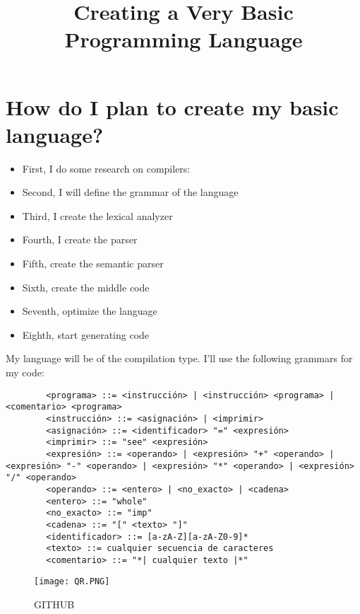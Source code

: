 \documentclass[a4,10pt]{article}
\title{Creating a Very Basic Programming Language}
\begin{document}
	
	\section{How do I plan to create my basic language?}
	\begin{itemize}
		\item First, I do some research on compilers: 
		\item Second, I will define the grammar of the language
		\item Third, I create the lexical analyzer
		\item Fourth, I create the parser
		\item Fifth, create the semantic parser
		\item Sixth, create the middle code
		\item Seventh, optimize the language
		\item Eighth, start generating code
	\end{itemize}
	My language will be of the compilation type.
	I'll use the following grammars for my code:
	
	\begin{verbatim}
		<programa> ::= <instrucción> | <instrucción> <programa> | <comentario> <programa>
		<instrucción> ::= <asignación> | <imprimir>
		<asignación> ::= <identificador> "=" <expresión>
		<imprimir> ::= "see" <expresión>
		<expresión> ::= <operando> | <expresión> "+" <operando> | <expresión> "-" <operando> | <expresión> "*" <operando> | <expresión> "/" <operando>
		<operando> ::= <entero> | <no_exacto> | <cadena>
		<entero> ::= "whole"
		<no_exacto> ::= "imp"
		<cadena> ::= "[" <texto> "]"
		<identificador> ::= [a-zA-Z][a-zA-Z0-9]*
		<texto> ::= cualquier secuencia de caracteres
		<comentario> ::= "*| cualquier texto |*"
	\end{verbatim}
	
	\printbibliography
	
	\begin{figure}[htb]
		\centering
		\texttt{[image: QR.PNG]}
		\caption{GITHUB}
	\end{figure}
	
\end{document}
